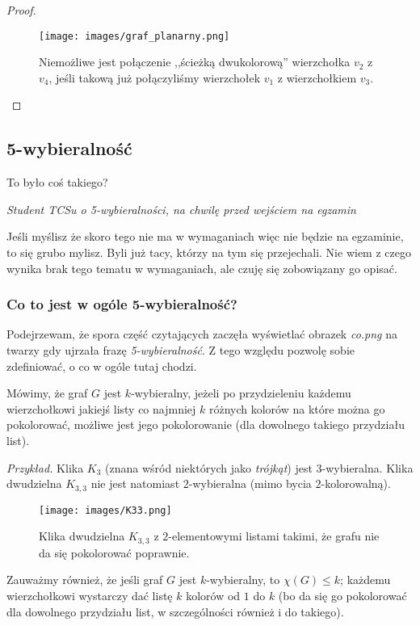 \begin{proof}
	\begin{figure}[H]
		\centering
		\texttt{[image: images/graf\_planarny.png]}
		\caption{Niemożliwe jest połączenie ,,ścieżką dwukolorową'' wierzchołka \(v_2\) z \(v_4\), jeśli takową już połączyliśmy wierzchołek \(v_1\) z wierzchołkiem \(v_3\).}
	\end{figure}

\end{proof}

\subsection{5-wybieralność}
\epigraph{To było coś takiego?}{\textit{Student TCSu o 5-wybieralności, na chwilę przed wejściem na egzamin}}
Jeśli myślisz że skoro tego nie ma w wymaganiach więc nie będzie na egzaminie, to się grubo mylisz. Byli już tacy, którzy na tym się przejechali. Nie wiem z czego wynika brak tego tematu w wymaganiach, ale czuję się zobowiązany go opisać.

\subsubsection{Co to jest w ogóle 5-wybieralność?}
Podejrzewam, że spora część czytających zaczęła wyświetlać obrazek \textit{co.png} na twarzy gdy ujrzała frazę \textit{5-wybieralność}. Z tego względu pozwolę sobie zdefiniować, o co w ogóle tutaj chodzi.

Mówimy, że graf \(G\) jest \(k\)-wybieralny, jeżeli po przydzieleniu każdemu wierzchołkowi jakiejś listy co najmniej \(k\) różnych kolorów na które można go pokolorować, możliwe jest jego pokolorowanie (dla dowolnego takiego przydziału list).

\textit{Przykład.} Klika \(K_3\) (znana wśród niektórych jako \textit{trójkąt}) jest 3-wybieralna. Klika dwudzielna \(K_{3,3}\) nie jest natomiast \(2\)-wybieralna (mimo bycia \(2\)-kolorowalną).

\begin{figure}[H]
	\centering
	\texttt{[image: images/K33.png]}
	\caption{Klika dwudzielna \(K_{3,3}\) z \(2\)-elementowymi listami takimi, że grafu nie da się pokolorować poprawnie.}
\end{figure}

Zauważmy również, że jeśli graf \(G\) jest \(k\)-wybieralny, to \(\chi(G) \leq k\); każdemu wierzchołkowi wystarczy dać listę \(k\) kolorów od \(1\) do \(k\) (bo da się go pokolorować dla dowolnego przydziału list, w szczególności również i do takiego).

